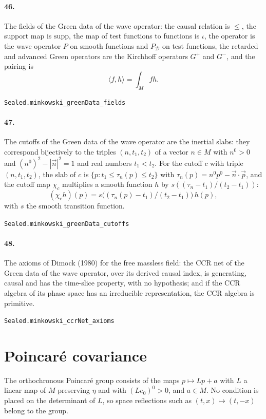 \documentclass[11pt]{article}
\begin{document}
\paragraph{46.} The fields of the Green data of the wave operator: the causal relation is $\le$, the support map is $\mathrm{supp}$, the map of test functions to functions is $\iota$, the operator is the wave operator $P$ on smooth functions and $P_{\mathcal D}$ on test functions, the retarded and advanced Green operators are the Kirchhoff operators $G^+$ and $G^-$, and the pairing is \[\langle f, h \rangle = \int_M f h.\]\par{\footnotesize\texttt{Sealed.minkowski\_greenData\_fields}}

\paragraph{47.} The cutoffs of the Green data of the wave operator are the inertial slabs: they correspond bijectively to the triples $(n, t_1, t_2)$ of a vector $n \in M$ with $n^0 > 0$ and $(n^0)^2 - |\vec n|^2 = 1$ and real numbers $t_1 < t_2$. For the cutoff $c$ with triple $(n, t_1, t_2)$, the slab of $c$ is $\{p : t_1 \le \tau_n(p) \le t_2\}$ with $\tau_n(p) = n^0 p^0 - \vec n \cdot \vec p$, and the cutoff map $\chi_c$ multiplies a smooth function $h$ by $s((\tau_n - t_1)/(t_2 - t_1))$: \[(\chi_c h)(p) = s\big((\tau_n(p) - t_1)/(t_2 - t_1)\big)\, h(p),\] with $s$ the smooth transition function.\par{\footnotesize\texttt{Sealed.minkowski\_greenData\_cutoffs}}

\paragraph{48.} The axioms of Dimock (1980) for the free massless field: the CCR net of the Green data of the wave operator, over its derived causal index, is generating, causal and has the time-slice property, with no hypothesis; and if the CCR algebra of its phase space has an irreducible representation, the CCR algebra is primitive.\par{\footnotesize\texttt{Sealed.minkowski\_ccrNet\_axioms}}

\section*{Poincaré covariance}
The orthochronous Poincaré group consists of the maps $p \mapsto L p + a$ with $L$ a linear map of $M$ preserving $\eta$ and with $(L e_0)^0 > 0$, and $a \in M$. No condition is placed on the determinant of $L$, so space reflections such as $(t, x) \mapsto (t, -x)$ belong to the group.
\end{document}
